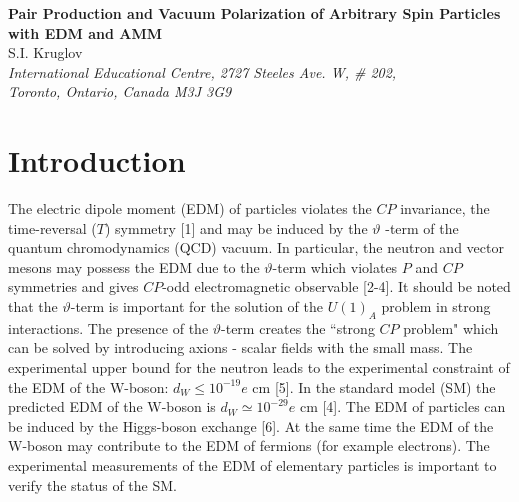 \documentclass[a4paper,12pt]{article}
\begin{document}
\begin{center}
{\bf Pair Production and Vacuum Polarization of Arbitrary Spin
Particles with EDM and AMM}\\
\vspace{5mm}
 S.I. Kruglov \\
\vspace{5mm}
\textit{International Educational Centre, 2727 Steeles Ave. W, \# 202, \\
Toronto, Ontario, Canada M3J 3G9}
\end{center}

\begin{abstract}
The exact solutions of the wave equation for arbitrary spin particles with
electric dipole and magnetic moments in the constant and uniform
electromagnetic field were found. The differential probability of pair
production of particles by an external electromagnetic field has been
calculated on the basis of the exact solutions. We have also estimated the
imaginary part of the constant and uniform electromagnetic field. The
nonlinear corrections to the Maxwell Lagrangian have been calculated taking
into account the vacuum polarization of arbitrary spin particles. The role
of electric dipole and magnetic moments of arbitrary spin particles in
instability of the vacuum is discussed.
\end{abstract}

\section{Introduction}

The electric dipole moment (EDM) of particles violates the $CP$ invariance,
the time-reversal ($T$) symmetry [1] and may be induced by the $\vartheta $
-term of the quantum chromodynamics (QCD) vacuum. In particular, the neutron
and vector mesons may possess the EDM due to the $\vartheta $-term which
violates $P$ and $CP$ symmetries and gives $CP$-odd electromagnetic
observable [2-4]. It should be noted that the $\vartheta $-term is important
for the solution of the $U(1)_A$ problem in strong interactions. The
presence of the $\vartheta $-term creates the ``strong $CP$ problem" which
can be solved by introducing axions - scalar fields with the small mass. The
experimental upper bound for the neutron leads to the experimental
constraint of the EDM of the W-boson: $d_W\leq 10^{-19}e$ cm [5]. In the
standard model (SM) the predicted EDM of the W-boson is $d_W\simeq 10^{-29}e$
cm [4]. The EDM of particles can be induced by the Higgs-boson exchange [6].
At the same time the EDM of the W-boson may contribute to the EDM of
fermions (for example electrons). The experimental measurements of the EDM
of elementary particles is important to verify the status of the SM.
\end{document}
